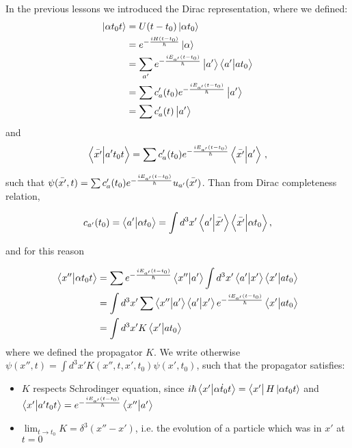 \documentclass[main.tex]{subfiles}
\begin{document}
In the previous lessons we introduced the Dirac representation, where we defined:
%
\begin{subequations}
\begin{align}
    \ket{\alpha t_0 t}
    &=U(t-t_0)\ket{\alpha t_0}  \\
    &=e^{-\frac{iH(t-t_0)}{\hbar}}\ket{\alpha} \\
    &=\sum_{a'} e^{-\frac{iE_{a'}(t-t_0)}{\hbar}}\ket{a'}\braket{a'}{a t_0} \\
    &=\sum c_a'(t_0)e^{-\frac{iE_{a'}(t-t_0)}{\hbar}}\ket{a'}  \\
    &=\sum c'_a(t)\ket{a'}
\end{align}
\end{subequations}
%
and
%
\begin{equation}
    \braket{\Bar{x'}}{a't_0 t}=\sum c_a'(t_0)e^{-\frac{iE_{a'}(t-t_0)}{\hbar}}\braket{\Bar{x'}}{a'}\,,
\end{equation}

such that $\psi(\Bar{x'},t)=\sum c_a'(t_0)e^{-\frac{iE_{a'}(t-t_0)}{\hbar}}u_{a'}(\Bar{x'})$.
Than from Dirac completeness relation,

\begin{align}
c_{a'}(t_0)=\braket{a'}{\alpha t_0}=\int d^3x' \braket{a'}{\Bar{x'}}\braket{\Bar{x'}}{\alpha t_0},
\end{align}

and for this reason


\begin{subequations}
\begin{align}
    \braket{x''}{\alpha t_0 t}
    &=\sum e^{-\frac{iE_{a'}(t-t_0)}{\hbar}}\braket{x''}{a'}\int d^3x'\braket{a'}{x'}\braket{x'}{a t_0}  \\
    &=\int d^3x'\sum \braket{x''}{a'} \braket{a'}{x'}e^{-\frac{iE_{a'}(t-t_0)}{\hbar}}\braket{x'}{a t_0} \\
    &=\int d^3x' K \braket{x'}{a t_0}
\end{align}
\end{subequations}
%
where we defined the propagator $K$. We write otherwise $\psi(x'',t)=\int d^3x' K(x'', t, x', t_0)\psi(x', t_0)$, such that the propagator satisfies:

\begin{itemize}
    \item $K$ respects Schrodinger equation, since $i\hbar\braket{x'}{\Dot{\alpha t_0 t}}=\bra{x'}H\ket{\alpha t_0 t}$ and $\braket{x'}{a' t_0 t}=e^{-\frac{iE_{a'}(t-t_0)}{\hbar}}\braket{x''}{a'}$
    \item $\lim_{t\to t_0}K=\delta^3(x''-x')$, i.e. the evolution of a particle which was in $x'$ at $t=0$
\end{itemize}
\end{document}
